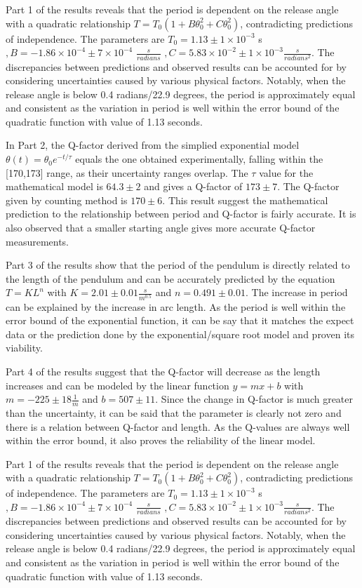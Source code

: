 \documentclass{article}
\begin{document}
Part 1 of the results reveals that the period is dependent on the release angle with a quadratic relationship $T = T_0(1 + B\theta_0^2 + C\theta_0^2)$, contradicting predictions of independence. The parameters are $T_0 = 1.13  \pm 1\times10^{-3} $ s $, B = -1.86\times10^{-4}  \pm 7\times10^{-4}$ $\frac{s}{radians}$ $, C = 5.83\times10^{-2} \pm 1\times10^{-3} \frac{s}{radians^2}$. The discrepancies between predictions and observed results can be accounted for by considering uncertainties caused by various physical factors. Notably, when the release angle is below 0.4 radians/22.9 degrees, the period is approximately equal and consistent as the variation in period is well within the error bound of the quadratic function with value of 1.13 seconds.

In Part 2, the Q-factor derived from the simplied exponential model $\theta(t) = \theta_0 e^{-t/\tau}$ equals the one obtained experimentally, falling within the [170,173] range, as their uncertainty ranges overlap. The $\tau$ value for the mathematical model  is $64.3 \pm 2$ and gives a Q-factor of $173 \pm 7$. The Q-factor given by counting method is $170 \pm 6$. This result suggest the mathematical prediction to the relationship between period and Q-factor is fairly accurate. It is also observed that a smaller starting angle gives more accurate Q-factor measurements.

Part 3 of the results show that the period of the pendulum is directly related to the length of the pendulum and can be accurately predicted by the equation $T = KL^n$ with $K = 2.01 \pm 0.01\frac{s}{m^{0.5}}$ and $n = 0.491 \pm 0.01$. The increase in period can be explained by the increase in arc length. As the period is well within the error bound of the exponential function, it can be say that it matches the expect data or the prediction done by the exponential/square root model and proven its viability. 

Part 4 of the results suggest that the Q-factor will decrease as the length increases and can be modeled by the linear function $y = mx + b$ with $m = -225 \pm 18\frac{1}{m}$ and $b = 507 \pm 11$. Since the change in Q-factor is much greater than the uncertainty, it can be said that the parameter is clearly not zero and there is a relation between Q-factor and length. As the Q-values are always well within the error bound, it also proves the reliability of the linear model.

Part 1 of the results reveals that the period is dependent on the release angle with a quadratic relationship $T = T_0(1 + B\theta_0^2 + C\theta_0^2)$, contradicting predictions of independence. The parameters are $T_0 = 1.13  \pm 1\times10^{-3} $ s $, B = -1.86\times10^{-4}  \pm 7\times10^{-4}$ $\frac{s}{radians}$ $, C = 5.83\times10^{-2} \pm 1\times10^{-3} \frac{s}{radians^2}$. The discrepancies between predictions and observed results can be accounted for by considering uncertainties caused by various physical factors. Notably, when the release angle is below 0.4 radians/22.9 degrees, the period is approximately equal and consistent as the variation in period is well within the error bound of the quadratic function with value of 1.13 seconds.
\end{document}
